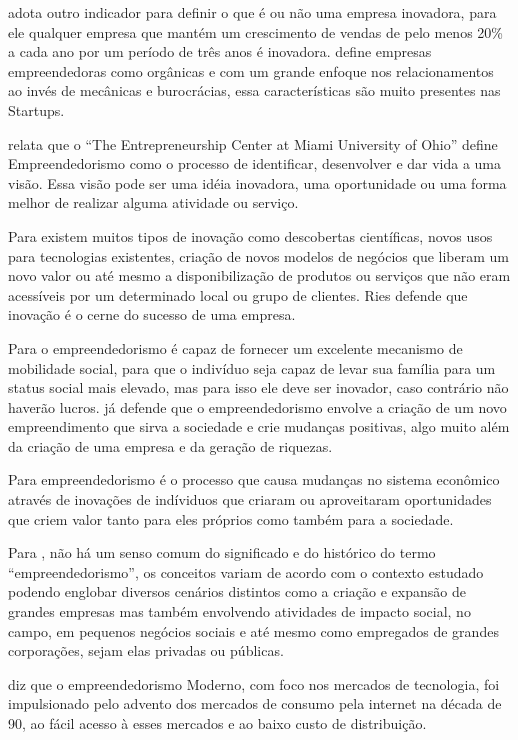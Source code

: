  adota outro indicador para definir o que é ou não uma empresa inovadora, para ele qualquer empresa que mantém um crescimento de vendas de pelo menos 20\% a cada ano por um período de três anos é inovadora.  define empresas empreendedoras como orgânicas e com um grande enfoque nos relacionamentos ao invés de mecânicas e burocrácias, essa características são muito presentes nas Startups.

 relata que o ``The Entrepreneurship Center at Miami University of Ohio'' define Empreendedorismo como o processo de identificar, desenvolver e dar vida a uma visão. Essa visão pode ser uma idéia inovadora, uma oportunidade ou uma forma melhor de realizar alguma atividade ou serviço.

Para  existem muitos tipos de inovação como descobertas científicas, novos usos para tecnologias existentes, criação de novos modelos de negócios que liberam um novo valor ou até mesmo a disponibilização de produtos ou serviços que não eram acessíveis por um determinado local ou grupo de clientes. Ries defende que inovação é o cerne do sucesso de uma empresa.

Para  o empreendedorismo é capaz de fornecer um excelente mecanismo de mobilidade social, para que o indivíduo seja capaz de levar sua família para um status social mais elevado, mas para isso ele deve ser inovador, caso contrário não haverão lucros.  já defende que o empreendedorismo envolve a criação de um novo empreendimento que sirva a sociedade e crie mudanças positivas, algo muito além da criação de uma empresa e da geração de riquezas. 

Para  empreendedorismo é o processo que causa mudanças no sistema econômico através de inovações de indíviduos que criaram ou aproveitaram oportunidades que criem valor tanto para eles próprios como também para a sociedade.

Para , não há um senso comum do significado e do histórico do termo ``empreendedorismo'', os conceitos variam de acordo com o contexto estudado podendo englobar diversos cenários distintos como a criação e expansão de grandes empresas mas também envolvendo atividades de impacto social, no campo, em pequenos negócios sociais e até mesmo como empregados de grandes corporações, sejam elas privadas ou públicas. 

 diz que o empreendedorismo Moderno, com foco nos mercados de tecnologia, foi impulsionado pelo advento dos mercados de consumo pela internet na década de 90, ao fácil acesso à esses mercados e ao baixo custo de distribuição.

